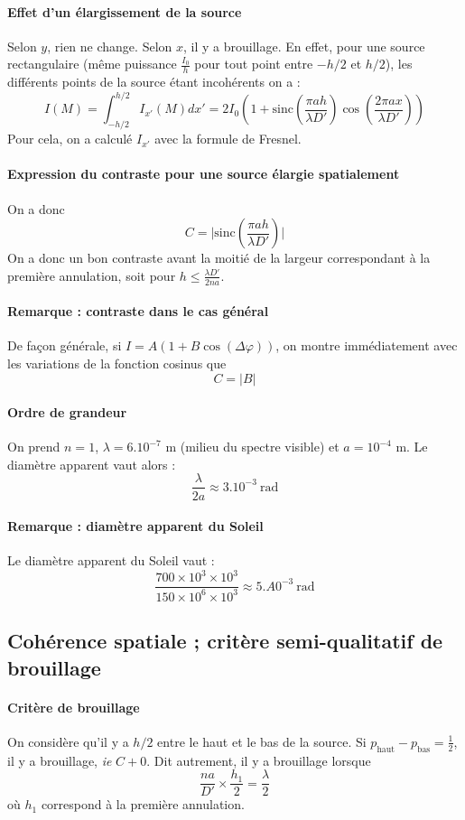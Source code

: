 \documentclass[french]{book}
\theoremstyle{plain}
\theoremstyle{definition}
\theoremstyle{remark}
\begin{document}
\paragraph{Effet d’un élargissement de la source} Selon $y$, rien ne change. Selon $x$, il y a brouillage. En effet, pour une source rectangulaire (même puissance $\frac{I_0}{h}$ pour tout point entre $-h/2$ et $h/2$), les différents
points de la source étant incohérents on a : $$I(M)=\int_{-h/2}^{h/2}I_{x'}(M)dx'=2I_0\left(1+\text{sinc}\left(\frac{\pi a h}{\lambda D'}\right)\cos\left(\frac{2\pi ax}{\lambda D'}\right)\right)$$ Pour cela, on a calculé $I_{x'}$ avec la formule de Fresnel.
\paragraph{Expression du contraste pour une source élargie spatialement} On a donc $$C=\bigg\lvert\text{sinc}\left(\frac{\pi a h}{\lambda D'}\right)\bigg\rvert$$ On a donc un bon contraste avant la moitié de la largeur correspondant à la première annulation, soit pour $h\leqslant\displaystyle\frac{\lambda D'}{2na}$.
\paragraph{Remarque : contraste dans le cas général} De façon générale, si $I=A(1+B\cos(\Delta\varphi))$, on montre immédiatement avec les variations de la fonction cosinus que $$C=\lvert B\rvert$$
\paragraph{Ordre de grandeur} On prend $n=1$, $\lambda=6.10^{-7}$ m (milieu du spectre visible) et $a=10^{-4}$ m. Le diamètre apparent vaut alors : $$\frac{\lambda}{2a}\approx 3.10^{-3} \ \text{rad}$$
\paragraph{Remarque : diamètre apparent du Soleil} Le diamètre apparent du Soleil vaut : $$\frac{700\times 10^3\times 10^3}{150\times10^{6}\times10^{3}}\approx 5.A0^{-3}\ \text{rad}$$
\subsection{Cohérence spatiale ; critère semi-qualitatif de brouillage}
\paragraph{Critère de brouillage} On considère qu'il y a $h/2$ entre le haut et le bas de la source. Si $p_\text{haut}-p_\text{bas}=\displaystyle\frac12$, il y a brouillage, \textit{ie} $C+0$. Dit autrement, il y a brouillage lorsque $$\frac{na}{D'}\times\frac{h_1}{2}=\frac{\lambda}{2}$$ où $h_1$ correspond à la première annulation.
\end{document}
